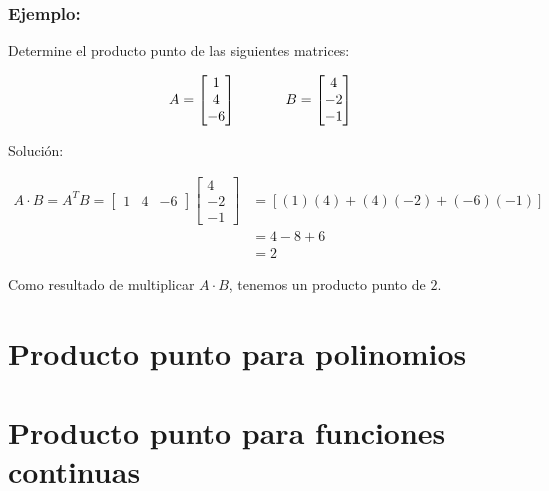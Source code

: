 \documentclass{article}
\begin{document}
    \subsubsection*{Ejemplo:}

    Determine el producto punto de las siguientes matrices:

    \begin{gather*}
        A = \begin{bmatrix}
            1  \\
            4  \\
            -6
        \end{bmatrix} \hspace{35 pt}
        B = \begin{bmatrix}
            4  \\
            -2 \\
            -1
        \end{bmatrix}
    \end{gather*}

    Solución:

    \begin{equation*}
        \begin{aligned}
            A \cdot B = A^TB = \begin{bmatrix}
                1 & 4 & -6
            \end{bmatrix} \begin{bmatrix}
                4 \\
                -2 \\
                -1
            \end{bmatrix}
            &=[(1)(4) + (4)(-2) + (-6)(-1)] \\
            &=4-8+6 \\
            &=2
        \end{aligned}
    \end{equation*}

    Como resultado de multiplicar $A \cdot B$, tenemos un producto punto de $2$.

\section{Producto punto para polinomios}

\section{Producto punto para funciones continuas}
\end{document}

